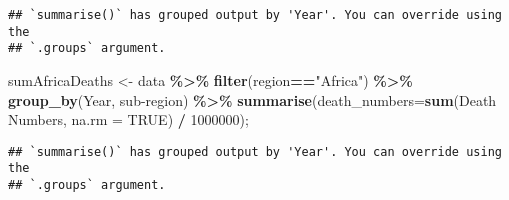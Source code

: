 \documentclass[
]{article}
\newenvironment{Shaded}{\begin{snugshade}}{\end{snugshade}}
\newcommand{\AttributeTok}[1]{\textcolor[rgb]{0.13,0.29,0.53}{#1}}
\newcommand{\ConstantTok}[1]{\textcolor[rgb]{0.56,0.35,0.01}{#1}}
\newcommand{\DecValTok}[1]{\textcolor[rgb]{0.00,0.00,0.81}{#1}}
\newcommand{\FunctionTok}[1]{\textcolor[rgb]{0.13,0.29,0.53}{\textbf{#1}}}
\newcommand{\NormalTok}[1]{#1}
\newcommand{\OtherTok}[1]{\textcolor[rgb]{0.56,0.35,0.01}{#1}}
\newcommand{\SpecialCharTok}[1]{\textcolor[rgb]{0.81,0.36,0.00}{\textbf{#1}}}
\newcommand{\StringTok}[1]{\textcolor[rgb]{0.31,0.60,0.02}{#1}}
\begin{document}
\begin{verbatim}
## `summarise()` has grouped output by 'Year'. You can override using the
## `.groups` argument.
\end{verbatim}

\begin{Shaded}
\begin{Highlighting}[]
\NormalTok{sumAfricaDeaths }\OtherTok{\textless{}{-}}\NormalTok{ data }\SpecialCharTok{\%\textgreater{}\%}
  \FunctionTok{filter}\NormalTok{(region}\SpecialCharTok{==}\StringTok{"Africa"}\NormalTok{) }\SpecialCharTok{\%\textgreater{}\%} 
  \FunctionTok{group\_by}\NormalTok{(Year, }\StringTok{\textasciigrave{}}\AttributeTok{sub{-}region}\StringTok{\textasciigrave{}}\NormalTok{) }\SpecialCharTok{\%\textgreater{}\%}
  \FunctionTok{summarise}\NormalTok{(}\AttributeTok{death\_numbers=}\FunctionTok{sum}\NormalTok{(}\StringTok{\textasciigrave{}}\AttributeTok{Death Numbers}\StringTok{\textasciigrave{}}\NormalTok{, }\AttributeTok{na.rm =} \ConstantTok{TRUE}\NormalTok{) }\SpecialCharTok{/} \DecValTok{1000000}\NormalTok{);}
\end{Highlighting}
\end{Shaded}

\begin{verbatim}
## `summarise()` has grouped output by 'Year'. You can override using the
## `.groups` argument.
\end{verbatim}
\end{document}
